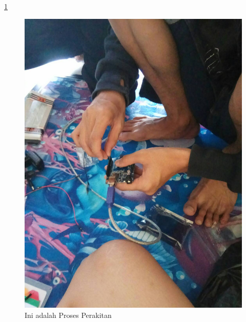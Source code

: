 \documentclass{article}
\begin{document}
  \ref{ar3}
  \begin{figure}[ht]
  \centerline{\includegraphics[width=1\textwidth]{../figures/ar3.jpg}}
  \caption{Ini adalah Proses Perakitan}
  \label{ar3}
  \end{figure}
\end{document}
